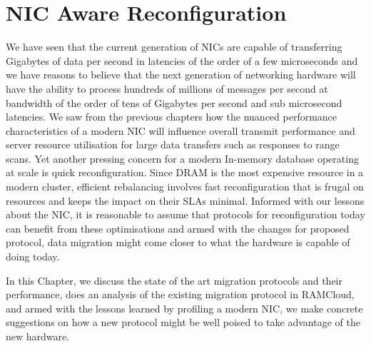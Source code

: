 
\chapter{NIC Aware Reconfiguration}
We have seen that the current generation of NICs are capable of transferring Gigabytes of 
data per second in latencies of the order of a few microseconds and we have reasons to believe 
that the next generation of networking hardware will have the ability to process 
hundreds of millions of messages per second at bandwidth of the order of tens of Gigabytes per 
second and sub microsecond latencies\cite{cx6}.
We saw from the previous chapters how the nuanced performance characteristics of 
a modern NIC will influence overall transmit performance and server resource utilisation 
for large data transfers such as responses to range scans. Yet another pressing 
concern for a modern In-memory database operating at scale is quick reconfiguration. 
Since DRAM is the most expensive resource in a modern cluster, efficient rebalancing 
involves fast reconfiguration that is frugal on resources and keeps the impact on their 
SLAs minimal. Informed with our lessons about the NIC, it is reasonable to assume that protocols for reconfiguration 
today can benefit from these optimisations and armed with the changes for proposed protocol, data migration might come 
closer to what the hardware is capable of doing today.

In this Chapter, we discuss the state of the art migration protocols and their 
performance, does an analysis of the existing migration protocol in RAMCloud, 
and armed with the lessons learned by profiling a modern NIC, we make concrete 
suggestions on how a new protocol might be well poised to take advantage of the 
new hardware.


